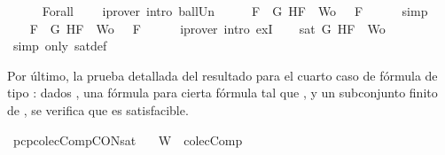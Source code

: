 \begin{isabellebody}
\ \ \ \ \isamarkupfalse%
\ Forall{}\ {}\ {}\ \isamarkupfalse%
\ {\isacharparenleft}iprover\ intro{\isacharcolon}\ ball{\isacharunderscore}Un{\isacharparenright}\isanewline
\ \ \isamarkupfalse%
\ \isamarkupfalse%
\ {\isachardoublequoteopen}{\isasymforall}F\ {\isasymin}\ {\isacharbraceleft}G{\isacharcomma}\isactrlbold {\isasymnot}\ H{\isacharcomma}F{\isacharbraceright}\ {\isasymunion}\ Wo{\isachardot}\ {\isasymA}\ {\isasymTurnstile}\ F{\isachardoublequoteclose}\isanewline
\ \ \ \ \isamarkupfalse%
\ simp\isanewline
\ \ \isamarkupfalse%
\ \isamarkupfalse%
\ {\isachardoublequoteopen}{\isasymexists}{\isasymA}{\isachardot}\ {\isasymforall}F\ {\isasymin}\ {\isacharparenleft}{\isacharbraceleft}G{\isacharcomma}\isactrlbold {\isasymnot}\ H{\isacharcomma}F{\isacharbraceright}\ {\isasymunion}\ Wo{\isacharparenright}{\isachardot}\ {\isasymA}\ {\isasymTurnstile}\ F{\isachardoublequoteclose}\isanewline
\ \ \ \ \isamarkupfalse%
\ {\isacharparenleft}iprover\ intro{\isacharcolon}\ exI{\isacharparenright}\isanewline
\ \ \isamarkupfalse%
\ {\isachardoublequoteopen}sat\ {\isacharparenleft}{\isacharbraceleft}G{\isacharcomma}\isactrlbold {\isasymnot}\ H{\isacharcomma}F{\isacharbraceright}\ {\isasymunion}\ Wo{\isacharparenright}{\isachardoublequoteclose}\isanewline
\ \ \ \ \isamarkupfalse%
\ {\isacharparenleft}simp\ only{\isacharcolon}\ sat{\isacharunderscore}def{\isacharparenright}\isanewline
{}\isamarkupfalse%
%
\endisatagproof
{\isafoldproof}%
%
\isadelimproof
%
\endisadelimproof
%
\begin{isamarkuptext}%
Por último, la prueba detallada del resultado para el cuarto caso de fórmula de tipo \isa{{\isasymalpha}}: 
  dados , una fórmula  para cierta fórmula  tal que ,  y  
  un subconjunto finito de , se verifica que  es satisfacible.%
\end{isamarkuptext}\isamarkuptrue%
\isamarkupfalse%
\ pcp{\isacharunderscore}colecComp{\isacharunderscore}CON{\isacharunderscore}sat{}{\isacharcolon}\isanewline
\ \ \ {\isachardoublequoteopen}W\ {\isasymin}\ colecComp{\isachardoublequoteclose}\isanewline

\end{isabellebody}
